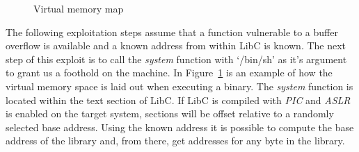 \documentclass{article}
\begin{document}
\begin{figure}[ht]%
  \centering
  \caption{\label{fig:vmmap} Virtual memory map}%
\end{figure}

The following exploitation steps assume that a function vulnerable to a buffer overflow is available and a known address from within LibC is known. The next step of this exploit is to call the \emph{system} function with `/bin/sh' as it's argument to grant us a foothold on the machine. In Figure~\ref{fig:vmmap} is an example of how the virtual memory space is laid out when executing a binary. The \emph{system} function is located within the text section of LibC. If LibC is compiled with \emph{PIC} and \emph{ASLR} is enabled on the target system, sections will be offset relative to a randomly selected base address. Using the known address it is possible to compute the base address of the library and, from there, get addresses for any byte in the library.
\end{document}
